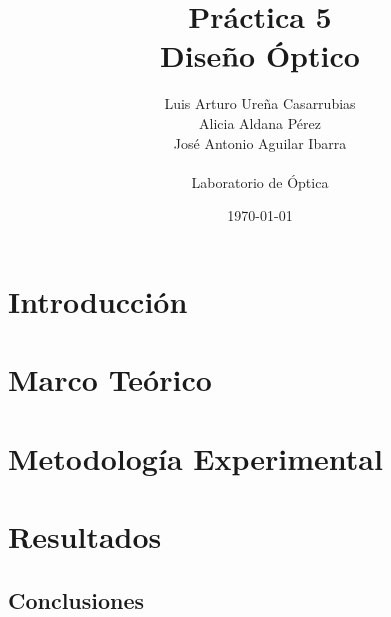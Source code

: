 \documentclass[11pt, spanish]{article}
\title{
	\textbf{Práctica 5\\
	Diseño Óptico}
}
\author{Luis Arturo Ureña Casarrubias\\
Alicia Aldana Pérez\\
José Antonio Aguilar Ibarra\\\\
Laboratorio de Óptica}
\date{\today}
\begin{document}
\maketitle

\abstract{
	
}

\begin{multicols}{2}

\section{Introducción}


\section{Marco Teórico}\label{sec: teo}


\section{Metodología Experimental}


\section{Resultados} \label{sec: res}
\end{multicols}


\begin{multicols}{2}
\section{Conclusiones}



\end{multicols}
\nocite{*}
\printbibliography
\end{document}

